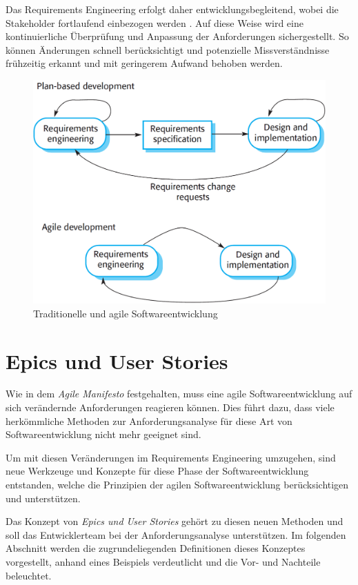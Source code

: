 \documentclass[acmtog]{acmart}
\begin{document}
Das Requirements Engineering erfolgt daher entwicklungsbegleitend, wobei die Stakeholder fortlaufend einbezogen werden \cite{sommerville16}. Auf diese Weise wird eine kontinuierliche Überprüfung und Anpassung der Anforderungen sichergestellt.
So können Änderungen schnell berücksichtigt und potenzielle Missverständnisse frühzeitig erkannt und mit geringerem Aufwand behoben werden.

\begin{figure}[t]
	\centering
	\includegraphics[width=\linewidth]{images/plandriven-and-agil-development.png}
	\caption{Traditionelle und agile Softwareentwicklung \cite{sommerville16}}
	\label{fig:development}
	\Description{}
\end{figure}

\section{Epics und User Stories} \label{def:epics_user_stories}
Wie in dem \emph{Agile Manifesto} \cite{beedle_principles_2001} festgehalten, muss eine agile Softwareentwicklung
auf sich verändernde Anforderungen reagieren können.
Dies führt dazu, dass viele herkömmliche Methoden zur Anforderungsanalyse für diese Art von Softwareentwicklung
nicht mehr geeignet sind.

Um mit diesen Veränderungen im Requirements Engineering umzugehen, sind neue Werkzeuge und Konzepte
für diese Phase der Softwareentwicklung entstanden, welche die Prinzipien der agilen Softwareentwicklung
berücksichtigen und unterstützen.

Das Konzept von \emph{Epics und User Stories} gehört zu diesen neuen Methoden und soll das Entwicklerteam
bei der Anforderungsanalyse unterstützen. Im folgenden Abschnitt werden die zugrundeliegenden Definitionen
dieses Konzeptes vorgestellt, anhand eines Beispiels verdeutlicht und die Vor- und Nachteile beleuchtet.
\end{document}
